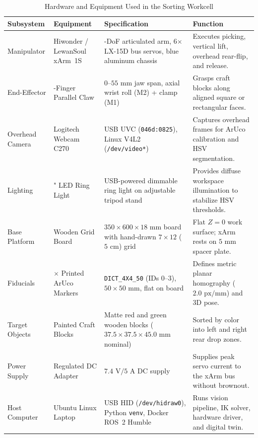 \documentclass[11pt,a4paper]{article}
\begin{document}
\begin{table}[H]
  \centering
  \small
  \caption{Hardware and Equipment Used in the Sorting Workcell}
  \label{tab:bom}
  \begin{tabularx}{\textwidth}{@{}>{\raggedright\arraybackslash}p{2.4cm} >{\raggedright\arraybackslash}p{3.3cm} >{\raggedright\arraybackslash}p{4.0cm} X@{}}
    \toprule
    \textbf{Subsystem} & \textbf{Equipment} & \textbf{Specification} & \textbf{Function} \\
    \midrule
    Manipulator & Hiwonder / LewanSoul xArm~1S & 6-DoF articulated arm, 6$\times$ LX-15D bus servos, blue aluminum chassis & Executes picking, vertical lift, overhead rear-flip, and release. \\
    End-Effector & 2-Finger Parallel Claw & $0\text{--}55\text{ mm}$ jaw span, axial wrist roll (M2) + clamp (M1) & Grasps craft blocks along aligned square or rectangular faces. \\
    Overhead Camera & Logitech Webcam C270 & USB UVC (\texttt{046d:0825}), Linux V4L2 (\texttt{/dev/video*}) & Captures overhead frames for ArUco calibration and HSV segmentation. \\
    Lighting & 10" LED Ring Light & USB-powered dimmable ring light on adjustable tripod stand & Provides diffuse workspace illumination to stabilize HSV thresholds. \\
    Base Platform & Wooden Grid Board & $350 \times 600 \times 18\text{ mm}$ board with hand-drawn $7 \times 12$ ($5\text{ cm}$) grid & Flat $Z=0$ work surface; xArm rests on $5\text{ mm}$ spacer plate. \\
    Fiducials & 4$\times$ Printed ArUco Markers & \texttt{DICT\_4X4\_50} (IDs 0--3), $50 \times 50\text{ mm}$, flat on board & Defines metric planar homography ($2.0\text{ px/mm}$) and 3D pose. \\
    Target Objects & Painted Craft Blocks & Matte red and green wooden blocks ($37.5 \times 37.5 \times 45.0\text{ mm}$ nominal) & Sorted by color into left and right rear drop zones. \\
    Power Supply & Regulated DC Adapter & $7.4\text{ V} / 5\text{ A}$ DC supply & Supplies peak servo current to the xArm bus without brownout. \\
    Host Computer & Ubuntu Linux Laptop & USB HID (\texttt{/dev/hidraw0}), Python \texttt{venv}, Docker ROS~2 Humble & Runs vision pipeline, IK solver, hardware driver, and digital twin. \\
    \bottomrule
  \end{tabularx}
\end{table}
\end{document}
